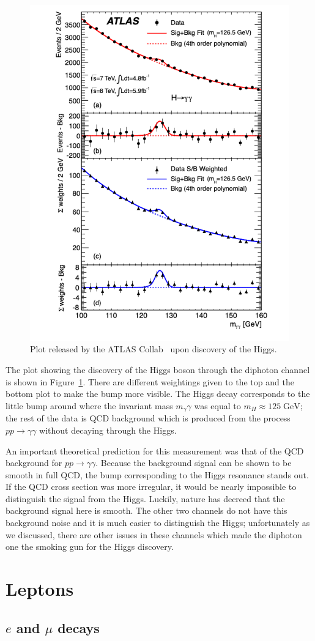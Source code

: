 \documentclass[11pt, oneside]{article}   	%
\theoremstyle{definition}
\numberwithin{equation}{subsection}		%
\begin{document}
\begingroup
\begin{figure}
	\vspace*{-.5cm}
	\centering
	\includegraphics[width = .4\textwidth]{higgs_discovery}
	\caption{Plot released by the ATLAS Collab~\cite{higgs} upon discovery of the Higgs.}
	\label{fig:higgs}
\end{figure}
The plot showing the discovery of the Higgs boson through the diphoton channel is shown in Figure~\ref{fig:higgs}. There are different weightings 
given to the top and the bottom plot to make the bump more visible. The Higgs decay corresponds 
to the little bump around where the invariant mass $m_\gamma\gamma$ was equal to $m_H \approx 125\;\mathrm{GeV}$; the rest of the 
data is QCD background which is produced from the process $pp\rightarrow\gamma\gamma$ without decaying through the Higgs. 

An important theoretical prediction for this measurement was that of the QCD background for $pp\rightarrow\gamma\gamma$. Because the 
background signal can be shown to be smooth in full QCD, the bump corresponding to the Higgs resonance stands out. If the 
QCD cross section was more irregular, it would be nearly impossible to distinguish the signal from the Higgs. Luckily, nature has decreed 
that the background signal here is smooth. The other two channels do not have this background noise and it is much easier to 
distinguish the Higgs; unfortunately as we discussed, there are other issues in these channels which made the diphoton one the 
smoking gun for the Higgs discovery.

\endgroup

\newpage
\section{Leptons}

\subsection{$e$ and $\mu$ decays}
\end{document}

